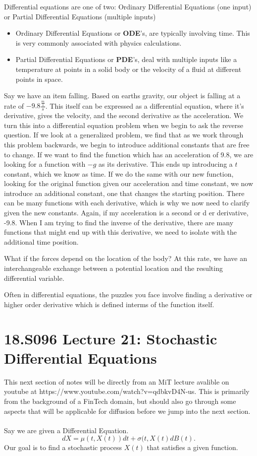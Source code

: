 \documentclass[10pt, oneside]{report}
\begin{document}
Differential equations are one of two:
Ordinary Differential Equations (one input) or Partial Differential Equations (multiple inputs)
\begin{itemize}
    \item Ordinary Differential Equations or \textbf{ODE}'s, are typically involving time.  This is very commonly associated with physics calculations.  
    \item Partial Differential Equations or \textbf{PDE}'s, deal with multiple inputs like a temperature at points in a solid body or the velocity of a fluid at different points in space. 
\end{itemize}
Say we have an item falling.  Based on earths gravity, our object is falling at a rate of $-9.8 \frac{\frac{m}{s}}{s}$.  This itself can be expressed as a differential equation, where it's derivative, gives the velocity, and the second derivative as the acceleration.  
We turn this into a differential equation problem when we begin to ask the reverse question.  If we look at a generalized problem, we find that as we work through this problem backwards, we begin to introduce additional constants that are free to change.  If we want to find the function which has an acceleration of 9.8, we are looking for a function with $-g$ as its derivative.  This ends up introducing a $t$ constant, which we know as time.  If we do the same with our new function, looking for the original function given our acceleration and time constant, we now introduce an additional constant, one that changes the starting position. 
There can be many functions with each derivative, which is why we now need to clarify given the new constants.  
Again, if my acceleration is a second or d er derivative, -9.8.  When I am trying to find the inverse of the derivative, there are many functions that might end up with this derivative, we need to isolate with the additional time position. 

What if the forces depend on the location of the body? At this rate, we have an interchangeable exchange between a potential location and the resulting differential variable.  

Often in differential equations, the puzzles you face involve finding a derivative or higher order derivative which is defined interms of the function itself. 

\section{18.S096 Lecture 21: Stochastic Differential Equations}
This next section of notes will be directly from an MiT lecture avalible on youtube at https://www.youtube.com/watch?v=qdbkvD4N-us.  This is primarily from the background of a FinTech domain, but should also go through some aspects that will be applicable for diffusion before we jump into the next section.
\\
\\
Say we are given a Differential Equation.  
\[
    dX = \mu(t, X(t))dt + \sigma(t, X(t) dB(t)
.\] 
Our goal is to find a stochastic process $X(t)$ that satisfies a given function.  
\end{document}
